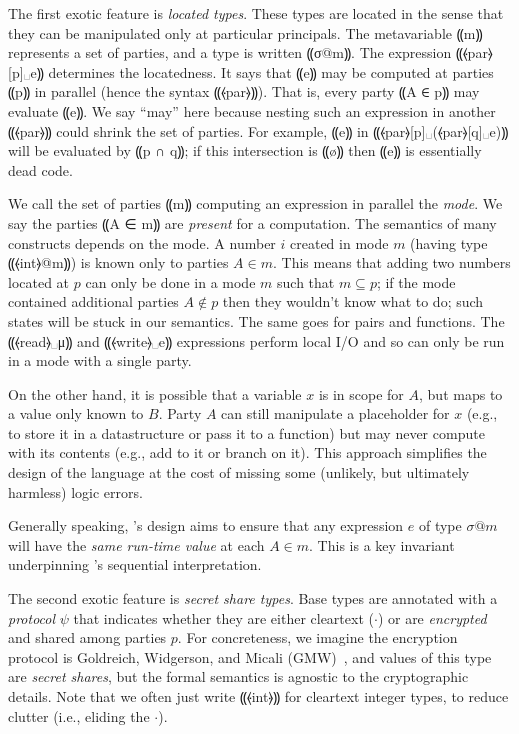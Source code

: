 The first exotic feature is \emph{located types}. These types are located
in the sense that they can be manipulated only at particular principals.
The metavariable ⸨m⸩ represents a set of parties, and a type is written ⸨σ@m⸩. The \mpc expression
⸨⦑par⦒[p]␣e⸩ determines the locatedness. It says that ⸨e⸩ may be computed at
parties ⸨p⸩ in parallel (hence the syntax ⸨⦑par⦒⸩). That is, every
party ⸨A ∈ p⸩ may evaluate ⸨e⸩. We say ``may'' here because
nesting such an expression in another ⸨⦑par⦒⸩ could shrink the set of
parties. For example, ⸨e⸩ in ⸨⦑par⦒[p]␣(⦑par⦒[q]␣e)⸩ will be
evaluated by ⸨p ∩ q⸩; if this intersection is ⸨ø⸩ then ⸨e⸩
is essentially dead code.

We call the set of parties ⸨m⸩ computing an expression in parallel
the \emph{mode}. We say the parties ⸨A ∈ m⸩ are \emph{present}
for a computation. The semantics of many constructs depends on the
mode. A number $i$ created in mode $m$ (having type ⸨⦑int⦒@m⸩) is
known only to parties $A \in m$. This means that adding two numbers
located at $p$ can only be done in a mode $m$ such that
$m \subseteq p$; if the mode contained additional parties
$A \not\in p$ then they wouldn't know what to do; such states will be
stuck in our semantics. The same goes for pairs and functions.
The ⸨⦑read⦒␣μ⸩ and ⸨⦑write⦒␣e⸩ expressions perform local
I/O and so can only be run in a mode with a single party.

On the other hand, it is possible that a variable $x$ is in scope for
$A$, but maps to a value only known to $B$. Party $A$ can
still manipulate a placeholder for $x$ (e.g., to store it in a
datastructure or pass it to a function) but may never compute with its
contents (e.g., add to it or branch on it). This approach
simplifies the design of the language at the cost of missing some
(unlikely, but ultimately harmless) logic errors.

Generally speaking, \mpc's design aims to ensure that any expression
$e$ of type $\sigma @ m$ will have the \emph{same run-time value} at
each $A \in m$. This is a key invariant underpinning \mpc's sequential
interpretation.

The second exotic feature is \emph{secret share types}.
Base types are annotated with a
\emph{protocol} $\psi$ that indicates whether they are either
cleartext ($\cdot$) or are \emph{encrypted} and shared among parties
$p$. For concreteness, we imagine the encryption protocol is
Goldreich, Widgerson, and Micali (GMW)~\citeyear{STOC:GolMicWig87},
and values of this type are \emph{secret shares}, but the formal
semantics is agnostic to the cryptographic details. Note that we
often just write ⸨⦑int⦒⸩ for cleartext integer types, to reduce
clutter (i.e., eliding the $\cdot$).

